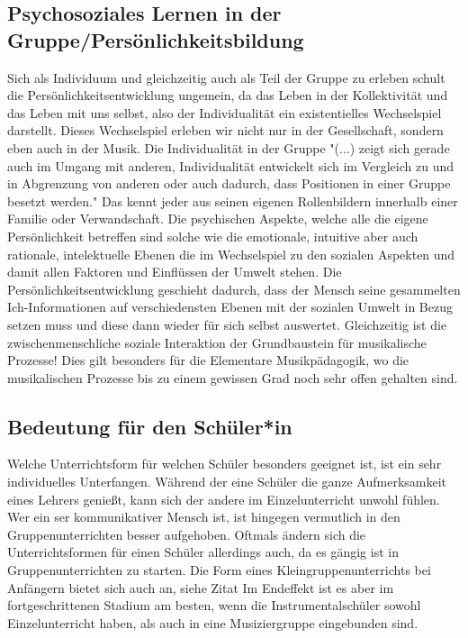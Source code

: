 \subsection*{Psychosoziales Lernen in der Gruppe/Persönlichkeitsbildung}
Sich als Individuum und gleichzeitig auch als Teil der Gruppe zu erleben schult
die Persönlichkeitsentwicklung ungemein, da das Leben in der Kollektivität und
das Leben mit uns selbst, also der Individualität ein existentielles
Wechselspiel darstellt. Dieses Wechselspiel erleben wir nicht nur in der Gesellschaft,
sondern eben auch in der Musik. Die Individualität in der Gruppe 
"(...) zeigt sich gerade auch im Umgang mit anderen,
Individualität entwickelt sich im Vergleich zu und in Abgrenzung von anderen
oder auch dadurch, dass Positionen in einer Gruppe besetzt werden."
Das kennt jeder aus seinen eigenen Rollenbildern innerhalb einer Familie oder
Verwandschaft. Die psychischen Aspekte, welche alle die eigene Persönlichkeit
betreffen sind solche wie die emotionale, intuitive aber auch rationale,
intelektuelle Ebenen die im Wechselspiel zu den sozialen Aspekten
und damit allen Faktoren und Einflüssen der Umwelt stehen. Die
Persönlichkeitsentwicklung geschieht dadurch, dass der Mensch
seine gesammelten Ich-Informationen auf verschiedensten Ebenen mit der sozialen
Umwelt in Bezug setzen muss und diese dann wieder für sich selbst auswertet.
Gleichzeitig ist die zwischenmenschliche soziale
Interaktion der Grundbaustein für musikalische Prozesse! %
Dies gilt besonders für die Elementare Musikpädagogik, wo die musikalischen
Prozesse bis zu einem gewissen Grad noch sehr offen gehalten sind.


\subsection*{Bedeutung für den Schüler*in}
Welche Unterrichtsform für welchen Schüler besonders geeignet ist, ist ein sehr
individuelles Unterfangen. Während der eine Schüler die ganze Aufmerksamkeit
eines Lehrers genießt, kann sich der andere im Einzelunterricht unwohl fühlen.
Wer ein ser kommunikativer Mensch ist, ist hingegen vermutlich in den
Gruppenunterrichten besser aufgehoben. Oftmals ändern sich die Unterrichtsformen
für einen Schüler allerdings auch, da es gängig ist in Gruppenunterrichten zu
starten. Die Form eines Kleingruppenunterrichts bei Anfängern bietet sich auch
an, siehe Zitat \autocite[220]{Busch:grundwissen_Instrumentalpädagogik}
Im Endeffekt ist es aber im fortgeschrittenen Stadium am besten, wenn die
Instrumentalschüler sowohl Einzelunterricht haben, als auch in eine
Musiziergruppe eingebunden sind. 

